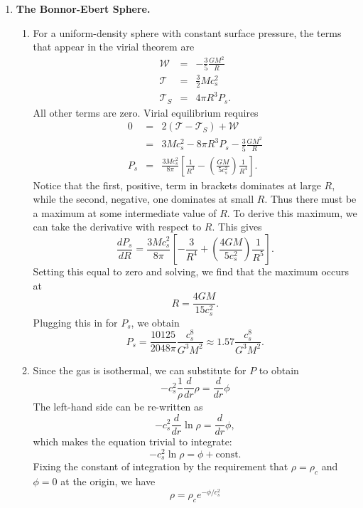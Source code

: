\solutionset

\begin{enumerate}

\item \textbf{The Bonnor-Ebert Sphere.}

\begin{enumerate}

\item For a uniform-density sphere with constant surface pressure, the terms that appear in the virial theorem are
\begin{eqnarray*}
\mathcal{W} & = & -\frac{3}{5} \frac{GM^2}{R} \\
\mathcal{T} & = & \frac{3}{2} M c_s^2 \\
\mathcal{T}_S & = & 4 \pi R^3 P_s.
\end{eqnarray*}
All other terms are zero. Virial equilibrium requires
\begin{eqnarray*}
0 & = & 2 (\mathcal{T} -\mathcal{T}_S) + \mathcal{W} \\
& = & 3 M c_s^2 - 8 \pi R^3 P_s - \frac{3}{5} \frac{G M^2}{R} \\
P_s & = & \frac{3 M c_s^2}{8\pi} \left[\frac{1}{R^3} - \left(\frac{G M}{5 c_s^2}\right)\frac{1}{R^4}\right].
\end{eqnarray*}
Notice that the first, positive, term in brackets dominates at large $R$, while the second, negative, one dominates at small $R$. Thus there must be a maximum at some intermediate value of $R$. To derive this maximum, we can take the derivative with respect to $R$. This gives
\begin{displaymath}
\frac{dP_s}{dR} = \frac{3 M c_s^2}{8\pi} \left[-\frac{3}{R^4} + \left(\frac{4 G M}{5 c_s^2}\right)\frac{1}{R^5}\right].
\end{displaymath}
Setting this equal to zero and solving, we find that the maximum occurs at
\begin{displaymath}
R = \frac{4 G M}{15 c_s^2}.
\end{displaymath}
Plugging this in for $P_s$, we obtain
\begin{displaymath}
P_s = \frac{10125}{2048\pi} \frac{c_s^8}{G^3 M^2} \approx 1.57 \frac{c_s^8}{G^3 M^2}.
\end{displaymath}

\item Since the gas is isothermal, we can substitute for $P$ to obtain
\begin{displaymath}
-c_s^2 \frac{1}{\rho} \frac{d}{dr}\rho = \frac{d}{dr}\phi
\end{displaymath}
The left-hand side can be re-written as
\begin{displaymath}
-c_s^2 \frac{d}{dr} \ln \rho = \frac{d}{dr}\phi,
\end{displaymath}
which makes the equation trivial to integrate:
\begin{displaymath}
-c_s^2 \ln \rho = \phi + \mathrm{const}.
\end{displaymath}
Fixing the constant of integration by the requirement that $\rho = \rho_c$ and $\phi=0$ at the origin, we have
\begin{displaymath}
\rho = \rho_c e^{-\phi/c_s^2}
\end{displaymath}


\end{enumerate}
\end{enumerate}

